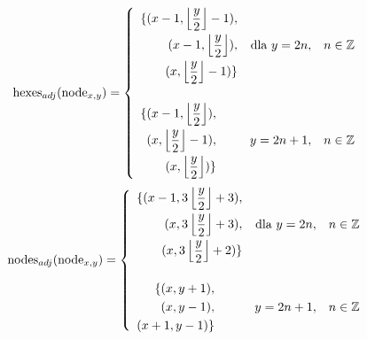 \documentclass[11pt,twoside]{report}
\begin{document}
\begin{equation}
  \text{hexes}_{adj}(\text{node}_{x,y})=
  \left\{
    \begin{array}{l r l}
      \begin{aligned}
      \{
      (x-1, \left\lfloor\frac{y}{2}\right\rfloor-1), \\
      (x-1, \left\lfloor\frac{y}{2}\right\rfloor), \\
      (x, \left\lfloor\frac{y}{2}\right\rfloor-1)
      \}
      \end{aligned} & \mbox{dla } y=2n, & n\in\mathbb{Z} \\[40pt]
      \begin{aligned}
        \{
        (x-1, \left\lfloor\frac{y}{2}\right\rfloor), \\
        (x, \left\lfloor\frac{y}{2}\right\rfloor-1), \\
        (x, \left\lfloor\frac{y}{2}\right\rfloor)
        \}
      \end{aligned} & y=2n+1, & n\in\mathbb{Z} \\
    \end{array} \right.
  \label{nodehexes}
\end{equation}
\begin{equation}
  \text{nodes}_{adj}(\text{node}_{x,y})=
  \left\{
    \begin{array}{l r l}
      \begin{aligned}
        \{
        (x-1, 3\left\lfloor\frac{y}{2}\right\rfloor+3), \\
        (x, 3\left\lfloor\frac{y}{2}\right\rfloor+3), \\
        (x, 3\left\lfloor\frac{y}{2}\right\rfloor+2)
        \}
      \end{aligned} & \mbox{dla } y=2n, & n\in\mathbb{Z} \\[40pt]
      \begin{aligned}
        \{
        (x, y+1), \\
        (x, y-1), \\
        (x+1, y-1)
        \}
      \end{aligned} & y=2n+1, & n\in\mathbb{Z} \\
    \end{array} \right.
  \label{nodenodes}
\end{equation}
\end{document}
